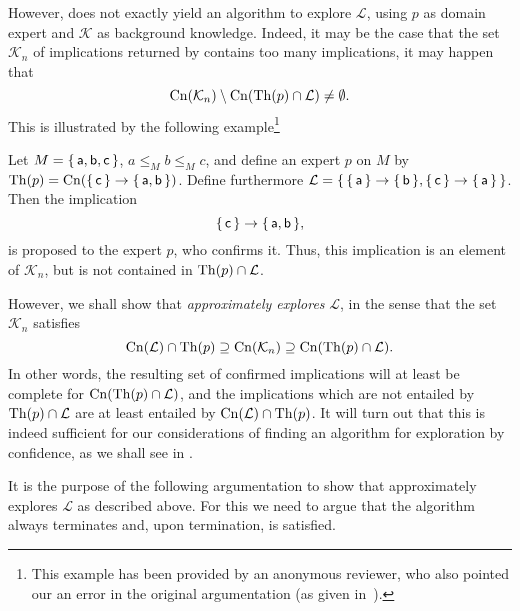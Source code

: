 However,  does not exactly yield an algorithm to explore
$\mathcal{L}$, using $p$ as domain expert and $\mathcal{K}$ as background knowledge.
Indeed, it may be the case that the set $\mathcal{K}_{n}$ of implications returned by
 contains too many implications, \ie it may happen that
\begin{equation*}
  \operatorname{Cn}(\mathcal{K}_{n}) \setminus \operatorname{Cn}(\operatorname{Th}(p) \cap \mathcal{L}) \neq \emptyset.
\end{equation*}
This is illustrated by the following example\footnote{This example has been provided by an
  anonymous reviewer, who also pointed our an error in the original argumentation (as
  given in~\cite{Borch-LTCS-13-04}).}

\begin{Example}
  \label{expl:exploring-sets-of-implications-may-be-approximative}
  Let $M = {\{\, \mathsf{a}, \mathsf{b}, \mathsf{c} \,\}}$, $a \leq_{M} b \leq_{M} c$, and
  define an expert $p$ on $M$ by $\operatorname{Th}(p) = \operatorname{Cn}({\{\, \mathsf{c} \,\}} \to {\ensuremath{\{\, \mathsf{a},
    \mathsf{b} \,\}}})$.  Define furthermore $\mathcal{L} = {\{\, {\{\, \mathsf{a} \,\}} \to {\ensuremath{\{\,
      \mathsf{b} \,\}}}, {\{\, \mathsf{c} \,\}} \to {\ensuremath{\{\, \mathsf{a} \,\}}} \,\}}$.  Then the implication
  \begin{equation*}
    {\ensuremath{\{\, \mathsf{c} \,\}}} \to {\ensuremath{\{\, \mathsf{a}, \mathsf{b} \,\}}},
  \end{equation*}
  is proposed to the expert $p$, who confirms it.  Thus, this implication is an element of
  $\mathcal{K}_{n}$, but is not contained in $\operatorname{Th}(p) \cap \mathcal{L}$.
\end{Example}

However, we shall show that  \emph{approximately explores}
$\mathcal{L}$, in the sense that the set $\mathcal{K}_{n}$ satisfies
\begin{equation}
  \label{eq:61}
  \operatorname{Cn}(\mathcal{L}) \cap \operatorname{Th}(p) \supseteq \operatorname{Cn}(\mathcal{K}_{n}) \supseteq \operatorname{Cn}(\operatorname{Th}(p) \cap \mathcal{L}).
\end{equation}
In other words, the resulting set of confirmed implications will at least be complete for
$\operatorname{Cn}(\operatorname{Th}(p) \cap \mathcal{L})$, and the implications which are not entailed by $\operatorname{Th}(p)
\cap \mathcal{L}$ are at least entailed by $\operatorname{Cn}(\mathcal{L}) \cap \operatorname{Th}(p)$.  It will turn
out that this is indeed sufficient for our considerations of finding an algorithm for
exploration by confidence, as we shall see in .

It is the purpose of the following argumentation to show that
 approximately explores $\mathcal{L}$ as described above.
For this we need to argue that the algorithm always terminates and, upon termination,
 is satisfied.

